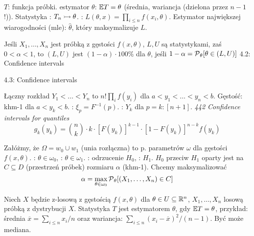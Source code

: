   $T$: funkcja próbki.
 estymator $\theta$: $\mathbb{E} T = \theta$ (średnia, wariancja (dzielona przez $n-1$!)). 
Statystyka  : $T_n \rightarrowtail \theta$.
: $L(\theta, x) = \prod_{i \le n} f(x_i, \theta)$.
Estymator największej wiarogodności (mle): $\widehat \theta$, który maksymalizuje $L$.

Jeśli $X_1, \ldots, X_n$ jest próbką z gęstości $f(x, \theta)$, $L, U$ są statystykami, zaś $0 < \alpha < 1$, to $(L, U)$ jest $(1-\alpha) \cdot 100 \%$  dla $\theta$, jeśli $1 - \alpha = \operatorname{\mathcal{P}}_\theta[\theta\in (L, U)]$
4.2: Confidence intervals

4.3: Confidence intervals

Łączny  rozkład  $Y_1 < \ldots < Y_n$ to $n! \prod_i f(y_i)$ dla $a < y_1 < \ldots < y_n < b$.
Gęstość: khm-1 dla $a < y_k < b$.
: $\xi_p = F^{-1}(p)$.
: $Y_k$ dla $p = k : [n+1]$.
\emph{442 Confidence intervals for quantiles}
\[
	g_k(y_k) = {n \choose k} \cdot k \cdot [F(y_k)]^{k-1} \cdot [1 - F(y_k)]^{n-k} f(y_k)
\]

Załóżmy, że  $\Omega = w_0 \cup w_1$ (unia rozłączna) to p. parametrów $\omega$ dla gęstości $f(x, \theta)$.
: $\theta \in \omega_0$, : $\theta \in \omega_1$.
: odrzucenie $H_0$, : $H_1$.
 $H_0$ przeciw $H_1$ oparty jest na  $C \subseteq D$ (przestrzeń próbek) rozmiaru $\alpha$ (khm-1).
Chcemy maksymalizować
\[
	\alpha = \max_{\theta \in \omega_0} \operatorname{\mathcal{P}}_\theta[(X_1, \ldots, X_n)\in C]
\]


Niech  $X$ będzie z-losową z gęstością $f(x, \theta)$ dla $\theta \in U \subseteq \mathbb{R}^n$, $X_1, \ldots, X_n$ losową próbką z dystrybucji $X$.
Statystyka $T$ jest  estymatorem $\theta$, gdy $\mathbb{E} T = \theta$, przykład: średnia $\overline x = \sum_{i \le n} x_i / n$ oraz wariancja: $\sum_{i \le n} (x_i - \overline x)^2 / (n-1)$.
Być może mediana.


